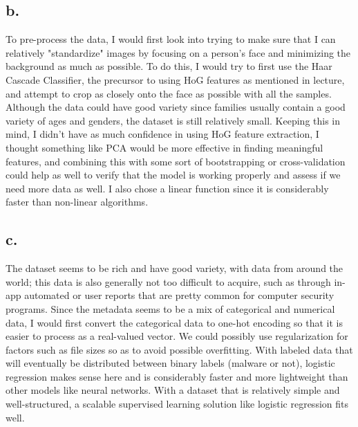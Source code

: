 \documentclass{article}
\newcommand{\1}{\mathbf{1}}
\begin{document}
{\subsection*{b.}

To pre-process the data, I would first look into trying to make sure that I can relatively "standardize" images by focusing on a person's face and minimizing the background as much as possible. To do this, I would try to first use the Haar Cascade Classifier, the precursor to using HoG features as mentioned in lecture, and attempt to crop as closely onto the face as possible with all the samples. Although the data could have good variety since families usually contain a good variety of ages and genders, the dataset is still relatively small. Keeping this in mind, I didn't have as much confidence in using HoG feature extraction, I thought something like PCA would be more effective in finding meaningful features, and combining this with some sort of bootstrapping or cross-validation could help as well to verify that the model is working properly and assess if we need more data as well. I also chose a linear function since it is considerably faster than non-linear algorithms.

\subsection*{c.}

The dataset seems to be rich and have good variety, with data from around the world; this data is also generally not too difficult to acquire, such as through in-app automated or user reports that are pretty common for computer security programs. Since the metadata seems to be a mix of categorical and numerical data, I would first convert the categorical data to one-hot encoding so that it is easier to process as a real-valued vector. We could possibly use regularization for factors such as file sizes so as to avoid possible overfitting. With labeled data that will eventually be distributed between binary labels (malware or not), logistic regression makes sense here and is considerably faster and more lightweight than other models like neural networks. With a dataset that is relatively simple and well-structured, a scalable supervised learning solution like logistic regression fits well. 

}
\end{document}
